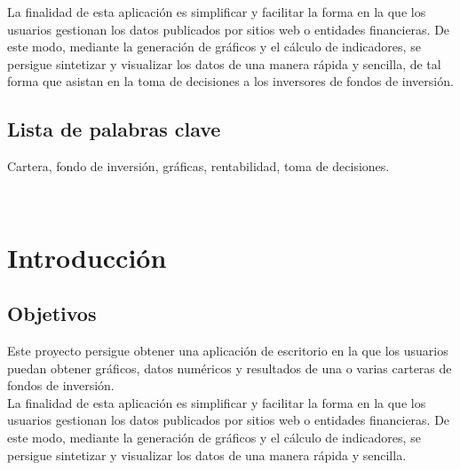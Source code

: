 \documentclass[12pt, a4paper]{book}
\begin{document}
La finalidad de esta aplicación es simplificar y facilitar la forma en la que los usuarios gestionan los datos publicados por sitios web o entidades financieras. De este modo, mediante la generación de gráficos y el cálculo de indicadores, se persigue sintetizar y visualizar los datos de una manera rápida y sencilla, de tal forma que asistan en la toma de decisiones a los inversores de fondos de inversión.
\vspace{7cm}

\section*{Lista de palabras clave} %

 Cartera, fondo de inversión, gráficas, rentabilidad, toma de decisiones.




\newpage
$\ $
\thispagestyle{empty} %

\newpage
\tableofcontents
\newpage

\listoffigures %
\newpage

\listoftables %
\newpage


\chapter{Introducción}

\section{Objetivos}

Este proyecto persigue obtener una aplicación de escritorio en la que los usuarios puedan obtener gráficos, datos numéricos y resultados de una o varias carteras de fondos de inversión.\\

La finalidad de esta aplicación es simplificar y facilitar la forma en la que los usuarios gestionan los datos publicados por sitios web o entidades financieras. De este modo, mediante la generación de gráficos y el cálculo de indicadores, se persigue sintetizar y visualizar los datos de una manera rápida y sencilla.\\
\end{document}
